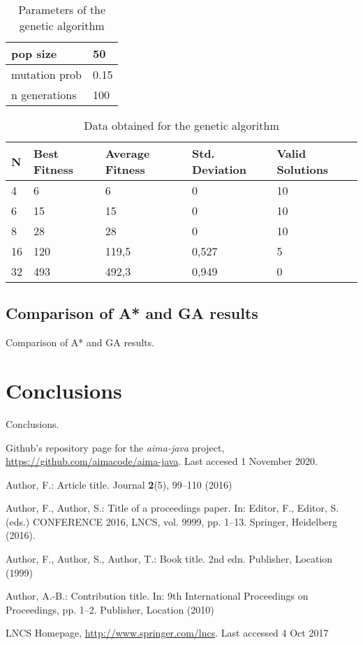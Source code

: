 \documentclass[11pt]{llncs}
\begin{document}
\begin{table}[]
\centering
\begin{tabular}{l|l}
pop size      & 50   \\ \hline
mutation prob & 0.15 \\ \hline
n generations & 100 
\end{tabular}
\caption{Parameters of the genetic algorithm}
\label{tab:ag-parameters}
\end{table}

\begin{table}[]
\centering
\begin{tabular}{lllll}
N  & Best Fitness & Average Fitness & Std. Deviation & Valid Solutions      \\ \hline
4  & 6            & 6               & 0              & 10                   \\
6  & 15           & 15              & 0              & 10                   \\
8  & 28           & 28              & 0              & 10                   \\
16 & 120          & 119,5           & 0,527          & 5                    \\
32 & 493          & 492,3           & 0,949          & 0
\end{tabular}
\caption{Data obtained for the genetic algorithm}
\label{tab:ag-data}
\end{table}
\subsection{Comparison of A* and GA results}\label{comparison_astar_gen}
Comparison of A* and GA results.
\section{Conclusions}\label{conclusions}
Conclusions.
\begin{thebibliography}{8}
Github's repository page for the \textit{aima-java} project, \url{https://github.com/aimacode/aima-java}. Last accesed 1 November 2020.

Author, F.: Article title. Journal \textbf{2}(5), 99--110 (2016)

Author, F., Author, S.: Title of a proceedings paper. In: Editor,
F., Editor, S. (eds.) CONFERENCE 2016, LNCS, vol. 9999, pp. 1--13.
Springer, Heidelberg (2016). 

Author, F., Author, S., Author, T.: Book title. 2nd edn. Publisher,
Location (1999)

Author, A.-B.: Contribution title. In: 9th International Proceedings
on Proceedings, pp. 1--2. Publisher, Location (2010)

LNCS Homepage, \url{http://www.springer.com/lncs}. Last accessed 4
Oct 2017
\end{thebibliography}
\end{document}
